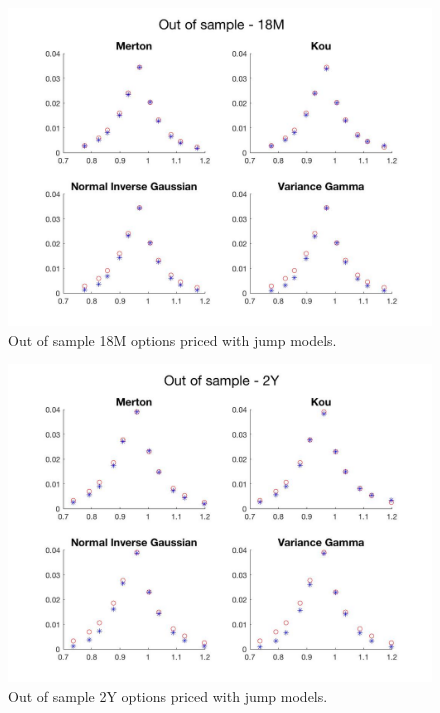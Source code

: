 \begin{figure}[!htb]
\centering
	\includegraphics[width=\textwidth]{gfx/out_18m}
	\caption{Out of sample 18M options priced with jump models.}
	\label{fig:out_18m}
\end{figure}
\begin{figure}[!htb]
\centering
	\includegraphics[width=\textwidth]{gfx/out_2y}
	\caption{Out of sample 2Y options priced with jump models.}
	\label{fig:out_2y}
\end{figure}

